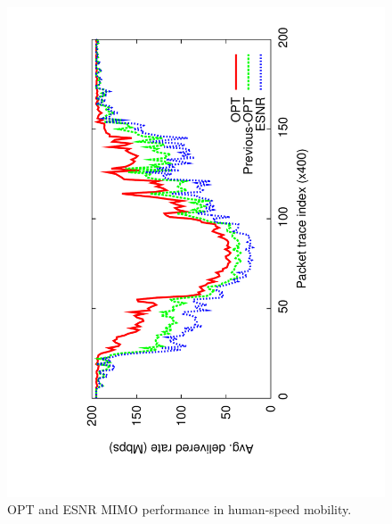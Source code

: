 \begin{figure}[p]
      \centering
      \includegraphics[angle=-90,viewport=125 68 491 760,clip,width=.95\columnwidth]{figures/mimo_skip_time.pdf}
      \vspace{-2pt}
      \caption{\label{fig:mimo_eff_snr_time} OPT and ESNR MIMO performance in human-speed mobility.}
\end{figure}

